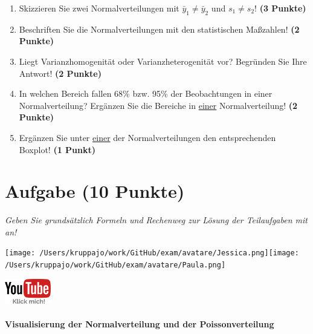 \documentclass[a4paper, 9pt]{scrartcl}\usepackage[]{graphicx}\usepackage[]{xcolor}
\begin{document}
\begin{enumerate}
\item Skizzieren Sie zwei Normalverteilungen mit $\bar{y}_1 \neq \bar{y}_2$ und $s_1 \neq s_2$! \textbf{(3 Punkte)}
\item Beschriften Sie die Normalverteilungen mit den statistischen Maßzahlen! \textbf{(2 Punkte)}
\item Liegt Varianzhomogenität oder Varianzheterogenität vor? Begründen Sie Ihre Antwort! \textbf{(2 Punkte)}
\item In welchen Bereich fallen 68\% bzw. 95\% der Beobachtungen in einer Normalverteilung? Ergänzen Sie die Bereiche in \underline{einer} Normalverteilung! \textbf{(2 Punkte)}
\item Ergänzen Sie unter \underline{einer} der Normalverteilungen den entsprechenden Boxplot! \textbf{(1 Punkt)}
\end{enumerate}

 
\clearpage

\section{Aufgabe \hfill (10 Punkte)}

\textit{Geben Sie grundsätzlich Formeln und Rechenweg zur Lösung der Teilaufgaben mit an!} \\[1Ex]
 

 
\begin{minipage}[t]{0.5\textwidth}
\texttt{[image: /Users/kruppajo/work/GitHub/exam/avatare/Jessica.png]}\hspace{-4mm}\texttt{[image: /Users/kruppajo/work/GitHub/exam/avatare/Paula.png]}
\end{minipage}
\begin{minipage}[t]{0.5\textwidth}
\hfill
\href{https://youtu.be/MiD42k4l5Ag}{\includegraphics[width = 2cm]{img/youtube}}
\end{minipage}



\paragraph{Visualisierung der Normalverteilung und der Poissonverteilung}
\end{document}
